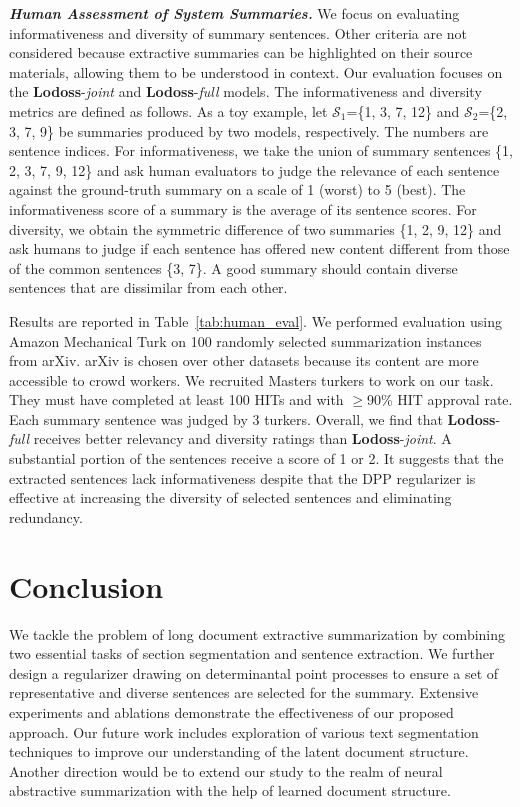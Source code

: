 \documentclass[11pt]{article}
\begin{document}
\vspace{0.05in}
\noindent\textbf{\textsl{Human Assessment of System Summaries.}}\quad
We focus on evaluating informativeness and diversity of summary sentences.
Other criteria are not considered because extractive summaries 
can be highlighted on their source materials, allowing them to be understood in context.
Our evaluation focuses on the \textbf{Lodoss}-\emph{joint} and \textbf{Lodoss}-\emph{full} models. 
The informativeness and diversity metrics are defined as follows.
As a toy example, let $\mathcal{S}_1$=\{1, 3, 7, 12\} and $\mathcal{S}_2$=\{2, 3, 7, 9\} be summaries produced by two models, respectively. 
The numbers are sentence indices.
For informativeness, we take the union of summary sentences
\{1, 2, 3, 7, 9, 12\}
and ask human evaluators to judge the relevance of each sentence
against the ground-truth summary
on a scale of 1 (worst) to 5 (best).
The informativeness score of a summary is the average of its sentence scores.
For diversity, we obtain the symmetric difference of two summaries 
\{1, 2, 9, 12\} and ask humans to judge if each sentence has offered new content different from those of the common sentences \{3, 7\}.
A good summary should contain diverse sentences that are dissimilar from each other.


Results are reported in Table~\ref{tab:human_eval}. 
We performed evaluation using Amazon Mechanical Turk on 100 randomly selected summarization instances from arXiv.
arXiv is chosen over other datasets because its content are more accessible to crowd workers. 
We recruited Masters turkers to work on our task.
They must have completed at least 100 HITs and with $\geq$90\% HIT approval rate.
Each summary sentence was judged by 3 turkers. 
Overall, we find that \textbf{Lodoss}-\emph{full} receives better relevancy and diversity ratings than \textbf{Lodoss}-\emph{joint}.
A substantial portion of the sentences receive a score of 1 or 2.
It suggests that the extracted sentences lack informativeness despite that the DPP regularizer is effective at increasing the diversity of selected sentences and eliminating redundancy. 


\section{Conclusion}

We tackle the problem of long document extractive summarization
by combining two essential tasks of section segmentation and sentence extraction.
We further design a regularizer drawing on determinantal point processes to 
ensure a set of representative and diverse sentences are selected for the summary.
Extensive experiments and ablations demonstrate the effectiveness of our proposed approach.
Our future work includes exploration of various text segmentation techniques to improve our understanding of the latent document structure. Another direction would be to extend our study to the realm of neural abstractive summarization with the help of learned document structure.
\end{document}
